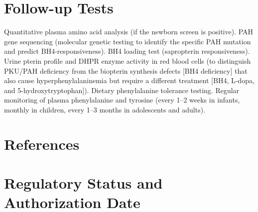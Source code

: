 \section*{Follow-up Tests}
Quantitative plasma amino acid analysis (if the newborn screen is positive). PAH gene sequencing (molecular genetic testing to identify the specific PAH mutation and predict BH4-responsiveness). BH4 loading test (sapropterin responsiveness). Urine pterin profile and DHPR enzyme activity in red blood cells (to distinguish PKU/PAH deficiency from the biopterin synthesis defects [BH4 deficiency] that also cause hyperphenylalaninemia but require a different treatment [BH4, L-dopa, and 5-hydroxytryptophan]). Dietary phenylalanine tolerance testing. Regular monitoring of plasma phenylalanine and tyrosine (every 1--2 weeks in infants, monthly in children, every 1--3 months in adolescents and adults).

\section*{References}



\clearpage
\section*{Regulatory Status and Authorization Date}

\clearpage
